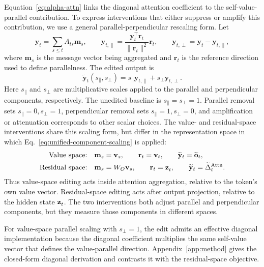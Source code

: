 Equation~\ref{eq:alpha-attn} links the diagonal attention coefficient to the
self-value-parallel contribution. To express interventions that either
suppress or amplify this contribution, we use a general
parallel-perpendicular rescaling form. Let
\begin{equation}
  \mathbf{y}_t = \sum_{s\le t} A_{ts}\mathbf{m}_s,\qquad
  \mathbf{y}_{t,\parallel}
    = \frac{\mathbf{y}_t^\top\mathbf{r}_t}{\|\mathbf{r}_t\|^2}\mathbf{r}_t,
  \qquad
  \mathbf{y}_{t,\perp}=\mathbf{y}_t-\mathbf{y}_{t,\parallel},
  \label{eq:unified-component-decomp}
\end{equation}
where $\mathbf{m}_s$ is the message vector being aggregated and
$\mathbf{r}_t$ is the reference direction used to define parallelness. The edited
output is
\begin{equation}
  \widetilde{\mathbf{y}}_t(s_{\parallel},s_{\perp})
    = s_{\parallel}\mathbf{y}_{t,\parallel}
      + s_{\perp}\mathbf{y}_{t,\perp}.
  \label{eq:unified-component-scaling}
\end{equation}
Here \(s_{\parallel}\) and \(s_{\perp}\) are multiplicative scales applied to
the parallel and perpendicular components, respectively. The unedited baseline
is \(s_{\parallel}=s_{\perp}=1\). Parallel removal sets
\(s_{\parallel}=0,s_{\perp}=1\), perpendicular removal sets
\(s_{\parallel}=1,s_{\perp}=0\), and amplification or attenuation corresponds
to other scalar choices. The value- and residual-space interventions share
this scaling form, but
differ in the representation space in which Eq.~\ref{eq:unified-component-scaling}
is applied:
\begin{equation}
  \begin{aligned}
    \text{Value space:}\quad
    &\mathbf{m}_s=\mathbf{v}_s,\qquad
      \mathbf{r}_t=\mathbf{v}_t,\qquad
      \widetilde{\mathbf{y}}_t=\widetilde{\mathbf{o}}_t, \\
    \text{Residual space:}\quad
    &\mathbf{m}_s=W_O\mathbf{v}_s,\qquad
      \mathbf{r}_t=\mathbf{z}^{}_{t},\qquad
      \widetilde{\mathbf{y}}_t=\widetilde{\Delta}_t^{\mathrm{Attn}}.
  \end{aligned}
  \label{eq:component-scaling-choices}
\end{equation}
Thus value-space editing acts inside attention aggregation, relative to the
token's own value vector.  Residual-space editing acts after output projection,
relative to the hidden state $\mathbf{z}^{}_{t}$.  The two interventions both adjust
parallel and perpendicular components, but they measure those components in
different spaces.

For value-space parallel scaling with \(s_{\perp}=1\), the edit admits an
effective diagonal implementation because the diagonal coefficient multiplies
the same self-value vector that defines the value-parallel direction.
Appendix~\ref{app:method} gives the closed-form diagonal derivation and
contrasts it with the residual-space objective.
